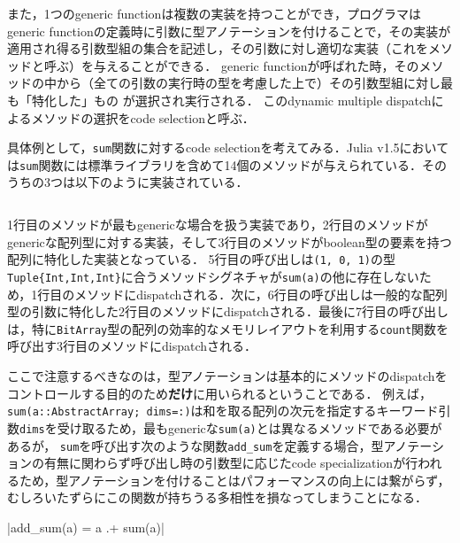 また，1つのgeneric functionは複数の実装を持つことができ，プログラマはgeneric functionの定義時に引数に型アノテーションを付けることで，その実装が適用され得る引数型組の集合を記述し，その引数に対し適切な実装（これをメソッドと呼ぶ）を与えることができる．
generic functionが呼ばれた時，そのメソッドの中から（全ての引数の実行時の型を考慮した上で）その引数型組に対し最も「特化した」もの\footnotemark
が選択され実行される．
このdynamic multiple dispatchによるメソッドの選択をcode selectionと呼ぶ．


具体例として，\texttt{sum}関数に対するcode selectionを考えてみる．Julia v1.5においては\texttt{sum}関数には標準ライブラリを含めて14個のメソッドが与えられている．そのうちの3つは以下のように実装されている．

\inputminted[frame=lines, linenos]{julia}{sums_method.jl}

1行目のメソッドが最もgenericな場合を扱う実装であり，2行目のメソッドがgenericな配列型に対する実装，そして3行目のメソッドがboolean型の要素を持つ配列に特化した実装となっている．
5行目の呼び出しは\texttt{(1, 0, 1)}の型\texttt{Tuple\{Int,Int,Int\}}に合うメソッドシグネチャが\texttt{sum(a)}の他に存在しないため，1行目のメソッドにdispatchされる．次に，6行目の呼び出しは一般的な配列型の引数に特化した2行目のメソッドにdispatchされる．最後に7行目の呼び出しは，特に\texttt{BitArray}型の配列の効率的なメモリレイアウトを利用する\texttt{count}関数を呼び出す3行目のメソッドにdispatchされる．

ここで注意するべきなのは，型アノテーションは基本的にメソッドのdispatchをコントロールする目的のため\textbf{だけ}に用いられるということである．
例えば，\texttt{sum(a::AbstractArray; dims=:)}は和を取る配列の次元を指定するキーワード引数\texttt{dims}を受け取るため，最もgenericな\texttt{sum(a)}とは異なるメソッドである必要があるが\footnotemark[1]，
\texttt{sum}を呼び出す次のような関数\texttt{add\_sum}を定義する場合，型アノテーションの有無に関わらず呼び出し時の引数型に応じたcode specializationが行われるため，型アノテーションを付けることはパフォーマンスの向上には繋がらず，むしろいたずらにこの関数が持ちうる多相性を損なってしまうことになる．\footnotemark[2]

|add_sum(a) = a .+ sum(a)|


